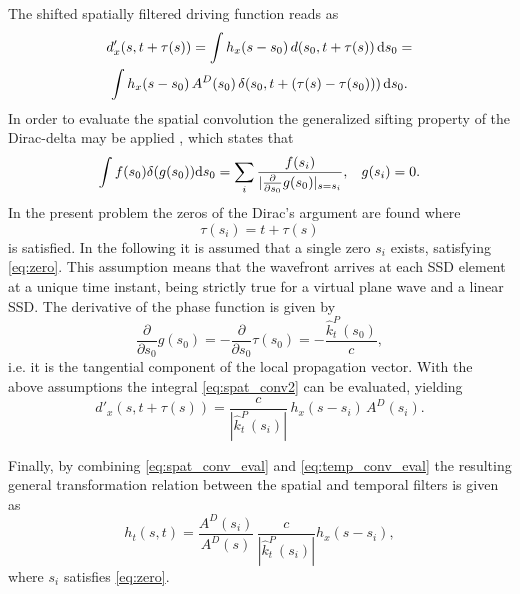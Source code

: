 \documentclass[conference]{IEEEtran}
\begin{document}
The shifted spatially filtered driving function reads as
\begin{multline}
    d'_x(s,t+ \tau(s) ) = \int h_x(s-s_0) \, d(s_0,t+ \tau(s) ) \, \td s_0 = \\
    \int h_x(s-s_0) \, A^D(s_0)\, \delta(s_0,t+ \left(\tau(s)-\tau(s_0)\right)  ) \, \td s_0.
    \label{eq:spat_conv2}
\end{multline}
In order to evaluate the spatial convolution the generalized sifting property of the Dirac-delta may be applied \cite{Firtha2019phd}, which states that
\begin{equation}
    \int f(s_0) \delta(g(s_0)) \mathrm{d} s_0 = \sum_i \frac{f(s_i)}{| \frac{\partial}{\partial s_0} g(s_0) |_{s = s_i}}, \hspace{3mm} g(s_i) = 0.
\end{equation}
In the present problem the zeros of the Dirac's argument are found where
\begin{equation}
    \tau(s_i) = t + \tau(s)
    \label{eq:zero}
\end{equation}
is satisfied.
In the following it is assumed that a single zero $s_i$ exists, satisfying \eqref{eq:zero}.
This assumption means that the wavefront arrives at each SSD element at a unique time instant, being strictly true for a virtual plane wave and a linear SSD.
The derivative of the phase function is given by
\begin{equation}
    \frac{\partial}{\partial s_0} g(s_0) = - \frac{\partial}{\partial s_0} \tau(s_0) = -\frac{\hat{k}_t^P(s_0)}{c},
\end{equation}
i.e. it is the tangential component of the local propagation vector.
With the above assumptions the integral \eqref{eq:spat_conv2} can be evaluated, yielding
\begin{equation}
    d'_x(s,t+ \tau(s) ) =  \frac{ c }{|\hat{k}_t^P(s_i)|} \, h_x(s-s_i) \, A^D(s_i)
    .
    \label{eq:spat_conv_eval}
\end{equation}

Finally, by combining \eqref{eq:spat_conv_eval} and \eqref{eq:temp_conv_eval} the resulting general transformation relation between the spatial and temporal filters is given as
\begin{equation}
    h_t\left(s,t\right) = \frac{A^D(s_i)}{A^D(s)} \, \frac{ c }{|\hat{k}_t^P(s_i)|} h_x(s-s_i),
\end{equation}
where $s_i$ satisfies \eqref{eq:zero}.
\end{document}
